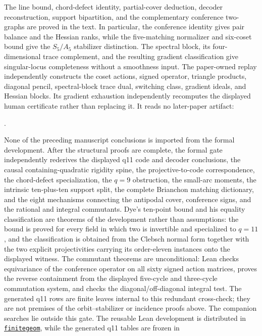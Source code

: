 \documentclass[11pt]{article}
\theoremstyle{definition}
\theoremstyle{remark}
\begin{document}
The line bound, chord-defect identity, partial-cover deduction, decoder
reconstruction, support bipartition, and the complementary conference
two-graphs are proved in the text.  In particular, the conference
identity gives pair balance and the Hessian ranks, while the five-matching
normalizer and six-coset bound give the $S_5/A_5$ stabilizer distinction.
The spectral block, its
four-dimensional trace complement, and the resulting gradient
classification give singular-locus completeness without a smoothness
input.  The paper-owned replay independently constructs
the coset actions, signed operator, triangle products, diagonal pencil,
spectral-block trace dual, switching class, gradient ideals, and Hessian blocks.
Its gradient exhaustion independently recomputes the displayed human
certificate rather than replacing it.
It reads no later-paper artifact:
\begin{center}
\small{}.
\end{center}
None of the preceding manuscript conclusions is imported from the formal
development.  After the structural proofs are complete, the formal gate
independently rederives the displayed q11 code and decoder conclusions, the
causal containing-quadratic rigidity spine, the projective-to-code correspondence,
the chord-defect specialization, the $q=9$ obstruction, the small-arc moments,
the intrinsic ten-plus-ten support split, the complete Brianchon matching
dictionary, and the eight mechanisms connecting the antipodal cover,
conference signs, and the rational and integral commutants.  Dye's ten-point
bound and his equality
classification are theorems of the development rather than assumptions: the
bound is proved for every field in which two is invertible and specialized to
$q=11$, and the classification is obtained from the Clebsch normal form together
with the two explicit projectivities carrying its order-eleven instances onto
the displayed witness.  The commutant theorems are unconditional: Lean checks
equivariance of the conference operator on all sixty signed action matrices,
proves the reverse
containment from the displayed five-cycle and three-cycle commutation system,
and checks the diagonal/off-diagonal integral test.  The generated q11
rows are finite leaves internal to this redundant cross-check; they are not
premises of the orbit--stabilizer or incidence proofs above.  The companion
searches lie outside this gate.  The reusable Lean development is distributed in
\href{https://github.com/tavisrudd/finitegeom}{\texttt{finitegeom}}, while
the generated q11 tables are frozen in
\end{document}
